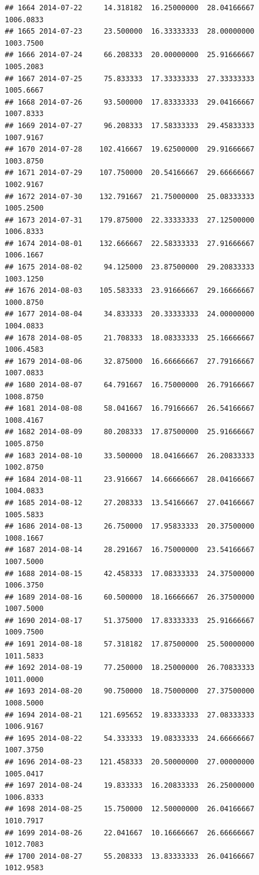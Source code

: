 \documentclass[
]{article}
\begin{document}
\begin{verbatim}
## 1664 2014-07-22     14.318182  16.25000000  28.04166667    1006.0833
## 1665 2014-07-23     23.500000  16.33333333  28.00000000    1003.7500
## 1666 2014-07-24     66.208333  20.00000000  25.91666667    1005.2083
## 1667 2014-07-25     75.833333  17.33333333  27.33333333    1005.6667
## 1668 2014-07-26     93.500000  17.83333333  29.04166667    1007.8333
## 1669 2014-07-27     96.208333  17.58333333  29.45833333    1007.9167
## 1670 2014-07-28    102.416667  19.62500000  29.91666667    1003.8750
## 1671 2014-07-29    107.750000  20.54166667  29.66666667    1002.9167
## 1672 2014-07-30    132.791667  21.75000000  25.08333333    1005.2500
## 1673 2014-07-31    179.875000  22.33333333  27.12500000    1006.8333
## 1674 2014-08-01    132.666667  22.58333333  27.91666667    1006.1667
## 1675 2014-08-02     94.125000  23.87500000  29.20833333    1003.1250
## 1676 2014-08-03    105.583333  23.91666667  29.16666667    1000.8750
## 1677 2014-08-04     34.833333  20.33333333  24.00000000    1004.0833
## 1678 2014-08-05     21.708333  18.08333333  25.16666667    1006.4583
## 1679 2014-08-06     32.875000  16.66666667  27.79166667    1007.0833
## 1680 2014-08-07     64.791667  16.75000000  26.79166667    1008.8750
## 1681 2014-08-08     58.041667  16.79166667  26.54166667    1008.4167
## 1682 2014-08-09     80.208333  17.87500000  25.91666667    1005.8750
## 1683 2014-08-10     33.500000  18.04166667  26.20833333    1002.8750
## 1684 2014-08-11     23.916667  14.66666667  28.04166667    1004.0833
## 1685 2014-08-12     27.208333  13.54166667  27.04166667    1005.5833
## 1686 2014-08-13     26.750000  17.95833333  20.37500000    1008.1667
## 1687 2014-08-14     28.291667  16.75000000  23.54166667    1007.5000
## 1688 2014-08-15     42.458333  17.08333333  24.37500000    1006.3750
## 1689 2014-08-16     60.500000  18.16666667  26.37500000    1007.5000
## 1690 2014-08-17     51.375000  17.83333333  25.91666667    1009.7500
## 1691 2014-08-18     57.318182  17.87500000  25.50000000    1011.5833
## 1692 2014-08-19     77.250000  18.25000000  26.70833333    1011.0000
## 1693 2014-08-20     90.750000  18.75000000  27.37500000    1008.5000
## 1694 2014-08-21    121.695652  19.83333333  27.08333333    1006.9167
## 1695 2014-08-22     54.333333  19.08333333  24.66666667    1007.3750
## 1696 2014-08-23    121.458333  20.50000000  27.00000000    1005.0417
## 1697 2014-08-24     19.833333  16.20833333  26.25000000    1006.8333
## 1698 2014-08-25     15.750000  12.50000000  26.04166667    1010.7917
## 1699 2014-08-26     22.041667  10.16666667  26.66666667    1012.7083
## 1700 2014-08-27     55.208333  13.83333333  26.04166667    1012.9583

\end{verbatim}
\end{document}
